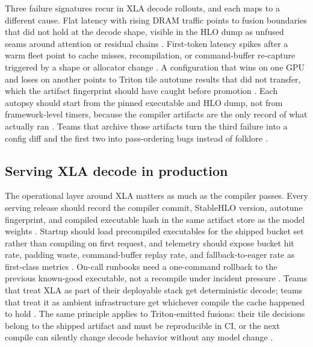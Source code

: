 Three failure signatures recur in XLA decode rollouts, and each maps to a different cause. Flat latency with rising DRAM traffic points to fusion boundaries that did not hold at the decode shape, visible in the HLO dump as unfused seams around attention or residual chains \citep{memoryfloor2026,openxla2024}. First-token latency spikes after a warm fleet point to cache misses, recompilation, or command-buffer re-capture triggered by a shape or allocator change \citep{patel2025llminference,nvidia2024cudagraphs}. A configuration that wins on one GPU and loses on another points to Triton tile autotune results that did not transfer, which the artifact fingerprint should have caught before promotion \citep{openxla2024,nvidia2022hopper}. Each autopsy should start from the pinned executable and HLO dump, not from framework-level timers, because the compiler artifacts are the only record of what actually ran \citep{chen2020compilerbasedhardw,yirage2026}. Teams that archive those artifacts turn the third failure into a config diff and the first two into pass-ordering bugs instead of folklore \citep{memoryfloor2026,taxbreak2026}.

\subsection{Serving XLA decode in production}

The operational layer around XLA matters as much as the compiler passes. Every serving release should record the compiler commit, StableHLO version, autotune fingerprint, and compiled executable hash in the same artifact store as the model weights \citep{openxla2024,patel2025llminference,memoryfloor2026}. Startup should load precompiled executables for the shipped bucket set rather than compiling on first request, and telemetry should expose bucket hit rate, padding waste, command-buffer replay rate, and fallback-to-eager rate as first-class metrics \citep{kwon2023vllm,taxbreak2026,chen2020compilerbasedhardw}. On-call runbooks need a one-command rollback to the previous known-good executable, not a recompile under incident pressure \citep{yirage2026,memoryfloor2026}. Teams that treat XLA as part of their deployable stack get deterministic decode; teams that treat it as ambient infrastructure get whichever compile the cache happened to hold \citep{patel2025llminference,openxla2024}.
The same principle applies to Triton-emitted fusions: their tile decisions belong to the shipped artifact and must be reproducible in CI, or the next compile can silently change decode behavior without any model change \citep{openxla2024,patel2025llminference}.

